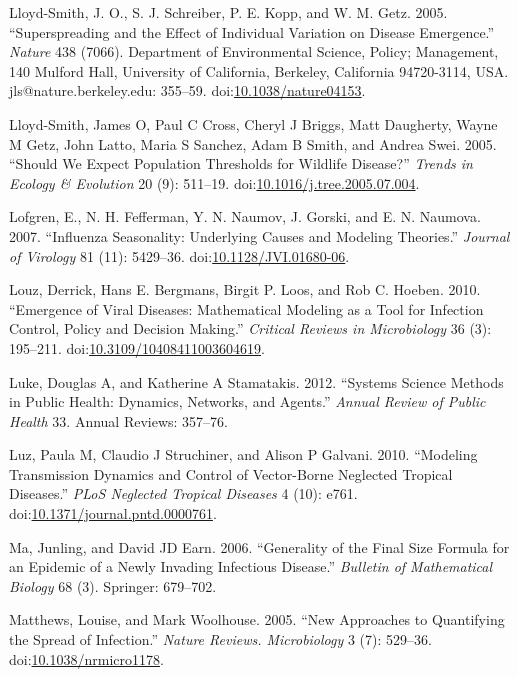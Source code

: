 \documentclass[]{book}
\theoremstyle{definition}
\theoremstyle{definition}
\theoremstyle{definition}
\theoremstyle{remark}
\begin{document}
\hypertarget{ref-lloyd-smith05}{}
Lloyd-Smith, J. O., S. J. Schreiber, P. E. Kopp, and W. M. Getz. 2005.
``Superspreading and the Effect of Individual Variation on Disease
Emergence.'' \emph{Nature} 438 (7066). Department of Environmental
Science, Policy; Management, 140 Mulford Hall, University of California,
Berkeley, California 94720-3114, USA. jls@nature.berkeley.edu: 355--59.
doi:\href{https://doi.org/10.1038/nature04153}{10.1038/nature04153}.

\hypertarget{ref-lloyd-smith05b}{}
Lloyd-Smith, James O, Paul C Cross, Cheryl J Briggs, Matt Daugherty,
Wayne M Getz, John Latto, Maria S Sanchez, Adam B Smith, and Andrea
Swei. 2005. ``Should We Expect Population Thresholds for Wildlife
Disease?'' \emph{Trends in Ecology \& Evolution} 20 (9): 511--19.
doi:\href{https://doi.org/10.1016/j.tree.2005.07.004}{10.1016/j.tree.2005.07.004}.

\hypertarget{ref-lofgren07}{}
Lofgren, E., N. H. Fefferman, Y. N. Naumov, J. Gorski, and E. N.
Naumova. 2007. ``Influenza Seasonality: Underlying Causes and Modeling
Theories.'' \emph{Journal of Virology} 81 (11): 5429--36.
doi:\href{https://doi.org/10.1128/JVI.01680-06}{10.1128/JVI.01680-06}.

\hypertarget{ref-louz10}{}
Louz, Derrick, Hans E. Bergmans, Birgit P. Loos, and Rob C. Hoeben.
2010. ``Emergence of Viral Diseases: Mathematical Modeling as a Tool for
Infection Control, Policy and Decision Making.'' \emph{Critical Reviews
in Microbiology} 36 (3): 195--211.
doi:\href{https://doi.org/10.3109/10408411003604619}{10.3109/10408411003604619}.

\hypertarget{ref-luke12}{}
Luke, Douglas A, and Katherine A Stamatakis. 2012. ``Systems Science
Methods in Public Health: Dynamics, Networks, and Agents.'' \emph{Annual
Review of Public Health} 33. Annual Reviews: 357--76.

\hypertarget{ref-luz10}{}
Luz, Paula M, Claudio J Struchiner, and Alison P Galvani. 2010.
``Modeling Transmission Dynamics and Control of Vector-Borne Neglected
Tropical Diseases.'' \emph{PLoS Neglected Tropical Diseases} 4 (10):
e761.
doi:\href{https://doi.org/10.1371/journal.pntd.0000761}{10.1371/journal.pntd.0000761}.

\hypertarget{ref-ma06}{}
Ma, Junling, and David JD Earn. 2006. ``Generality of the Final Size
Formula for an Epidemic of a Newly Invading Infectious Disease.''
\emph{Bulletin of Mathematical Biology} 68 (3). Springer: 679--702.

\hypertarget{ref-matthews05}{}
Matthews, Louise, and Mark Woolhouse. 2005. ``New Approaches to
Quantifying the Spread of Infection.'' \emph{Nature Reviews.
Microbiology} 3 (7): 529--36.
doi:\href{https://doi.org/10.1038/nrmicro1178}{10.1038/nrmicro1178}.
\end{document}
